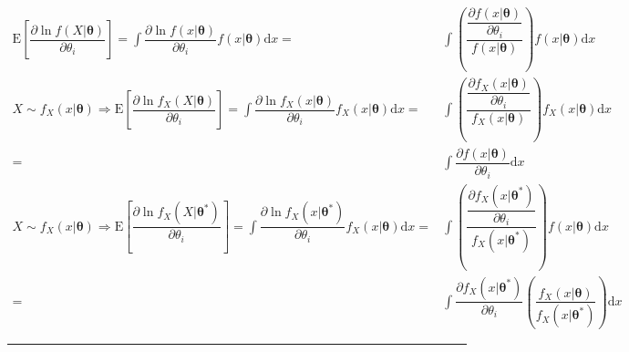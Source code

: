 \documentclass[
]{book}
\theoremstyle{definition}
\theoremstyle{definition}
\theoremstyle{definition}
\theoremstyle{definition}
\theoremstyle{remark}
\begin{document}
\[
\begin{aligned}
\mathrm{E}\left[\dfrac{\partial\ln f\left(X|\boldsymbol{\theta}\right)}{\partial\theta_{{\scriptscriptstyle i}}}\right]=\int\dfrac{\partial\ln f\left(x|\boldsymbol{\theta}\right)}{\partial\theta_{{\scriptscriptstyle i}}}f\left(x|\boldsymbol{\theta}\right)\mathrm{d}x= & \int\left(\dfrac{\dfrac{\partial f\left(x|\boldsymbol{\theta}\right)}{\partial\theta_{{\scriptscriptstyle i}}}}{f\left(x|\boldsymbol{\theta}\right)}\right)f\left(x|\boldsymbol{\theta}\right)\mathrm{d}x\\
X\sim f_{{\scriptscriptstyle X}}\left(x|\boldsymbol{\theta}\right)\Rightarrow\mathrm{E}\left[\dfrac{\partial\ln f_{{\scriptscriptstyle X}}\left(X|\boldsymbol{\theta}\right)}{\partial\theta_{{\scriptscriptstyle i}}}\right]=\int\dfrac{\partial\ln f_{{\scriptscriptstyle X}}\left(x|\boldsymbol{\theta}\right)}{\partial\theta_{{\scriptscriptstyle i}}}f_{{\scriptscriptstyle X}}\left(x|\boldsymbol{\theta}\right)\mathrm{d}x= & \int\left(\dfrac{\dfrac{\partial f_{{\scriptscriptstyle X}}\left(x|\boldsymbol{\theta}\right)}{\partial\theta_{{\scriptscriptstyle i}}}}{f_{{\scriptscriptstyle X}}\left(x|\boldsymbol{\theta}\right)}\right)f_{{\scriptscriptstyle X}}\left(x|\boldsymbol{\theta}\right)\mathrm{d}x\\
= & \int\dfrac{\partial f\left(x|\boldsymbol{\theta}\right)}{\partial\theta_{{\scriptscriptstyle i}}}\mathrm{d}x\\
X\sim f_{{\scriptscriptstyle X}}\left(x|\boldsymbol{\theta}\right)\Rightarrow\mathrm{E}\left[\dfrac{\partial\ln f_{{\scriptscriptstyle X}}\left(X|\boldsymbol{\theta}^{*}\right)}{\partial\theta_{{\scriptscriptstyle i}}}\right]=\int\dfrac{\partial\ln f_{{\scriptscriptstyle X}}\left(x|\boldsymbol{\theta}^{*}\right)}{\partial\theta_{{\scriptscriptstyle i}}}f_{{\scriptscriptstyle X}}\left(x|\boldsymbol{\theta}\right)\mathrm{d}x= & \int\left(\dfrac{\dfrac{\partial f_{{\scriptscriptstyle X}}\left(x|\boldsymbol{\theta}^{*}\right)}{\partial\theta_{{\scriptscriptstyle i}}}}{f_{{\scriptscriptstyle X}}\left(x|\boldsymbol{\theta}^{*}\right)}\right)f\left(x|\boldsymbol{\theta}\right)\mathrm{d}x\\
= & \int\dfrac{\partial f_{{\scriptscriptstyle X}}\left(x|\boldsymbol{\theta}^{*}\right)}{\partial\theta_{{\scriptscriptstyle i}}}\left(\dfrac{f_{{\scriptscriptstyle X}}\left(x|\boldsymbol{\theta}\right)}{f_{{\scriptscriptstyle X}}\left(x|\boldsymbol{\theta}^{*}\right)}\right)\mathrm{d}x
\end{aligned}
\]

\begin{center}\rule{0.5\linewidth}{0.5pt}\end{center}
\end{document}
